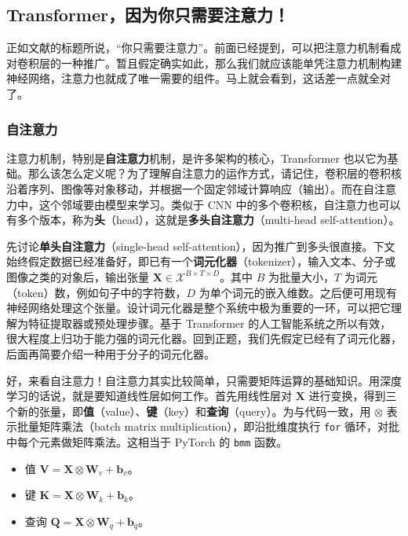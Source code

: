 \subsection{Transformer，因为你只需要注意力！}

正如文献的标题所说，“你只需要注意力”。前面已经提到，可以把注意力机制看成对卷积层的一种推广。暂且假定确实如此，那么我们就应该能单凭注意力机制构建神经网络，注意力也就成了唯一需要的组件。马上就会看到，这话差一点就全对了。

\subsubsection{自注意力}

注意力机制，特别是\textbf{自注意力}机制，是许多架构的核心，Transformer 也以它为基础。那么该怎么定义呢？为了理解自注意力的运作方式，请记住，卷积层的卷积核沿着序列、图像等对象移动，并根据一个固定邻域计算响应（输出）。而在自注意力中，这个邻域要由模型来学习。类似于 CNN 中的多个卷积核，自注意力也可以有多个版本，称为\textbf{头}（head），这就是\textbf{多头自注意力}（multi-head self-attention）。

先讨论\textbf{单头自注意力}（single-head self-attention），因为推广到多头很直接。下文始终假定数据已经准备好，即已有一个\textbf{词元化器}（tokenizer），输入文本、分子或图像之类的对象后，输出张量 $\mathbf{X}\in\mathcal{X}^{B\times T\times D}$。其中 $B$ 为批量大小，$T$ 为词元（token）数，例如句子中的字符数，$D$ 为单个词元的嵌入维数。之后便可用现有神经网络处理这个张量。设计词元化器是整个系统中极为重要的一环，可以把它理解为特征提取器或预处理步骤。基于 Transformer 的人工智能系统之所以有效，很大程度上归功于能力强的词元化器。回到正题，我们先假定已经有了词元化器，后面再简要介绍一种用于分子的词元化器。

好，来看自注意力！自注意力其实比较简单，只需要矩阵运算的基础知识。用深度学习的话说，就是要知道线性层如何工作。首先用线性层对 $\mathbf{X}$ 进行变换，得到三个新的张量，即\textbf{值}（value）、\textbf{键}（key）和\textbf{查询}（query）。为与代码一致，用 $\otimes$ 表示批量矩阵乘法（batch matrix multiplication），即沿批维度执行 \texttt{for} 循环，对批中每个元素做矩阵乘法。这相当于 PyTorch 的 \texttt{bmm} 函数。
\begin{itemize}
\item 值 $\mathbf{V}=\mathbf{X}\otimes\mathbf{W}_v+\mathbf{b}_v$。
\item 键 $\mathbf{K}=\mathbf{X}\otimes\mathbf{W}_k+\mathbf{b}_k$。
\item 查询 $\mathbf{Q}=\mathbf{X}\otimes\mathbf{W}_q+\mathbf{b}_q$。
\end{itemize}

